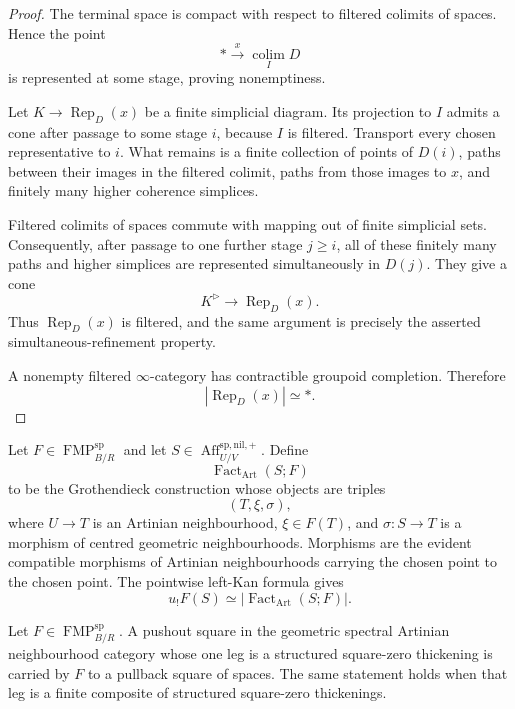 \begin{proof}
The terminal space is compact with respect to filtered colimits of spaces.
Hence the point
\[
    *\xrightarrow{x}\operatorname*{colim}_I D
\]
is represented at some stage, proving nonemptiness.

Let $K\to\operatorname{Rep}_D(x)$ be a finite simplicial diagram.  Its
projection to $I$ admits a cone after passage to some stage $i$, because $I$
is filtered.  Transport every chosen representative to $i$.  What remains is
a finite collection of points of $D(i)$, paths between their images in the
filtered colimit, paths from those images to $x$, and finitely many higher
coherence simplices.

Filtered colimits of spaces commute with mapping out of finite simplicial
sets.  Consequently, after passage to one further stage $j\geq i$, all of
these finitely many paths and higher simplices are represented simultaneously
in $D(j)$.  They give a cone
\[
    K^\triangleright\longrightarrow\operatorname{Rep}_D(x).
\]
Thus $\operatorname{Rep}_D(x)$ is filtered, and the same argument is precisely
the asserted simultaneous-refinement property.

A nonempty filtered $\infty$-category has contractible groupoid completion.
Therefore
\[
\boxed{
    \left|\operatorname{Rep}_D(x)\right|\simeq *.}
\]
\end{proof}


\begin{definition}
\label{def:bnli-artinian-factorization-category}
Let $F\in\operatorname{FMP}^{\mathrm{sp}}_{B/R}$ and let
$S\in\operatorname{Aff}^{\mathrm{sp,nil,+}}_{U/V}$.  Define
\[
    \operatorname{Fact}_{\mathrm{Art}}(S;F)
\]
to be the Grothendieck construction whose objects are triples
\[
    (T,\xi,\sigma),
\]
where $U\to T$ is an Artinian neighbourhood, $\xi\in F(T)$, and
$\sigma:S\to T$ is a morphism of centred geometric neighbourhoods.  Morphisms
are the evident compatible morphisms of Artinian neighbourhoods carrying the
chosen point to the chosen point.  The pointwise left-Kan formula gives
\[
\boxed{
    u_!F(S)
    \simeq
    \left|
      \operatorname{Fact}_{\mathrm{Art}}(S;F)
    \right|.}
\]
\end{definition}

\begin{lemma}
\label{lem:bnli-fmp-finite-artinian-excision}
Let $F\in\operatorname{FMP}^{\mathrm{sp}}_{B/R}$.  A pushout square in the
geometric spectral Artinian neighbourhood category whose one leg is a
structured square-zero thickening is carried by $F$ to a pullback square of
spaces.  The same statement holds when that leg is a finite composite of
structured square-zero thickenings.
\end{lemma}

